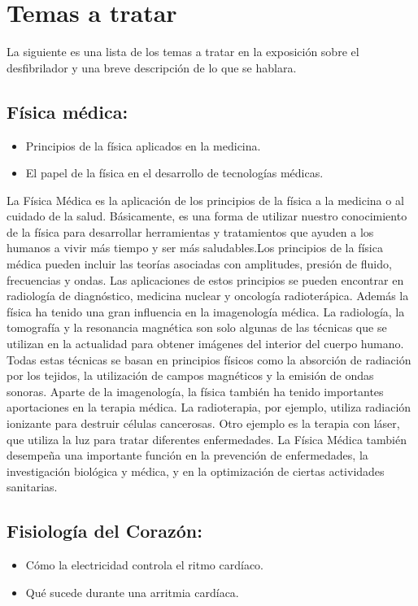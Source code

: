 \section{Temas a tratar}
La siguiente es una lista de los temas a tratar en la exposición sobre el desfibrilador y una breve descripción de lo que se hablara.

\subsection{Física médica:}
\begin{itemize}
    \item Principios de la física aplicados en la medicina.
    \item El papel de la física en el desarrollo de tecnologías médicas.
\end{itemize}

La Física Médica es la aplicación de los principios de la física a la medicina o al cuidado de la salud. Básicamente, es una forma de utilizar nuestro conocimiento de la física para desarrollar herramientas y tratamientos que ayuden a los humanos a vivir más tiempo y ser más saludables.Los principios de la física médica pueden incluir las teorías asociadas con amplitudes, presión de fluido, frecuencias y ondas. Las aplicaciones de estos principios se pueden encontrar en radiología de diagnóstico, medicina nuclear y oncología radioterápica. Además la física ha tenido una gran influencia en la imagenología médica. La radiología, la tomografía y la resonancia magnética son solo algunas de las técnicas que se utilizan en la actualidad para obtener imágenes del interior del cuerpo humano. Todas estas técnicas se basan en principios físicos como la absorción de radiación por los tejidos, la utilización de campos magnéticos y la emisión de ondas sonoras. Aparte de la imagenología, la física también ha tenido importantes aportaciones en la terapia médica. La radioterapia, por ejemplo, utiliza radiación ionizante para destruir células cancerosas. Otro ejemplo es la terapia con láser, que utiliza la luz para tratar diferentes enfermedades. La Física Médica también desempeña una importante función en la prevención de enfermedades, la investigación biológica y médica, y en la optimización de ciertas actividades sanitarias.

\subsection{Fisiología del Corazón:}
\begin{itemize}
    \item Cómo la electricidad controla el ritmo cardíaco.
    \item Qué sucede durante una arritmia cardíaca.
\end{itemize}


